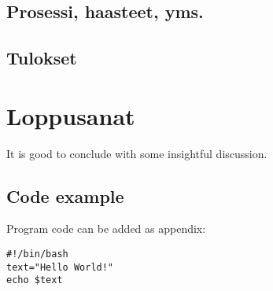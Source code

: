 \documentclass[finnish,twoside,openright]{HYgraduMLDS}
\begin{document}
\section{Prosessi, haasteet, yms.}


\section{Tulokset}


\chapter{Loppusanat\label{chapter:Loppusanat}}

It is good to conclude with some insightful discussion. 


\cleardoublepage %



\begin{appendices}
\myappendixtitle

\chapter{Code example\label{appendix:code}}
Program code can be added as appendix:
\begin{verbatim}
#!/bin/bash          
text="Hello World!"
echo $text
\end{verbatim}

\end{appendices}
\end{document}
